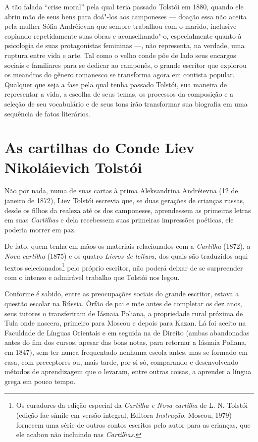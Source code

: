 A tão falada ``crise moral'' pela qual teria passado Tolstói em
1880, quando ele abriu mão de seus bens para doá"-los aos camponeses
--- doação essa não aceita pela mulher Sófia Andrêievna que sempre
trabalhou com o marido, inclusive copiando repetidamente suas obras e
aconselhando"-o, especialmente quanto à psicologia de suas protagonistas
femininas ---, não representa, na verdade, uma ruptura entre vida e
arte. Tal como o velho conde põe de lado seus encargos sociais e
familiares para se dedicar ao camponês, o grande escritor que explorou
os meandros do gênero romanesco se transforma agora em contista popular.
Qualquer que seja a fase pela qual tenha passado Tolstói, sua maneira de
representar a vida, a escolha de seus temas, os processos da composição
e a seleção de seu vocabulário e de seus tons irão transformar sua
biografia em uma sequência de fatos literários.

\chapter{As cartilhas do Conde Liev Nikoláievich Tolstói}

Não por nada, numa de suas cartas à prima Aleksandrina Andréievna (12 de
janeiro de 1872), Liev Tolstói escrevia que, se
duas gerações de crianças russas, desde os filhos da realeza até os dos
camponeses, aprendessem as primeiras letras em suas \emph{Cartilhas} e dela
recebessem suas primeiras impressões poéticas, ele poderia morrer em
paz.

De fato, quem tenha em mãos os materiais relacionados com
a \emph{Cartilha} (1872), a \emph{Nova cartilha} (1875) e os
quatro \emph{Livros de leitura}, dos quais são traduzidos aqui textos
selecionados\footnote{Os curadores da edição especial da \emph{Cartilha
  e Nova cartilha} de L. N. Tolstói (edição fac-símile em versão
  integral, Editora \emph{Instrução}, Moscou, 1979) fornecem uma série
  de outros contos escritos pelo autor para as crianças, que ele acabou
  não incluindo nas \emph{Cartilhas.}} pelo próprio escritor, não poderá deixar de se
surpreender com o intenso e admirável trabalho que Tolstói nos legou.

Conforme é sabido, entre as preocupações sociais do grande escritor,
estava a questão escolar na Rússia. Órfão de pai e mãe antes de
completar os dez anos, seus tutores o transferiram de Iásnaia Poliana, a
propriedade rural próxima de Tula onde nascera, primeiro para Moscou e
depois para Kazan. Lá foi aceito na Faculdade de Línguas Orientais e em
seguida na de Direito (ambas abandonadas antes do fim dos
cursos, apesar das boas notas, para retornar a Iásnaia Poliana, em
1847), sem ter nunca frequentado nenhuma escola antes, mas se formado em
casa, com preceptores ou, mais tarde, por si só, comparando e
desenvolvendo métodos de aprendizagem que o levaram, entre outras
coisas, a aprender a língua grega em pouco tempo. 

